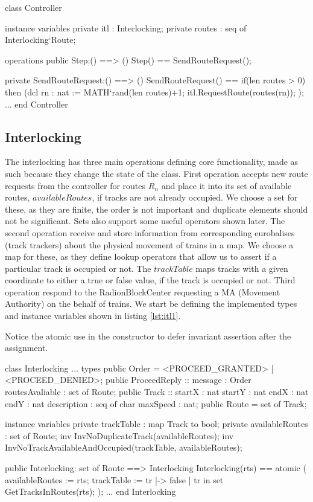 \documentclass[preprint,12pt]{elsarticle}
\begin{document}
\begin{vdmsl}[label=lst:controller,caption=State variables and the SendRouteRequest() operation in the Controller.]
	class Controller
	
	instance variables
	private itl : Interlocking;
	private routes : seq of Interlocking`Route;
	
	operations
	public Step:() ==> ()
	Step() == SendRouteRequest();
	
	private SendRouteRequest:() ==> ()
	SendRouteRequest() ==
	if(len routes > 0) then
		(dcl rn : nat := MATH`rand(len routes)+1;
			itl.RequestRoute(routes(rn));
	);
	...
	end Controller
\end{vdmsl}

\subsection{Interlocking}

The interlocking has three main operations defining core functionality, made as such because they change the state of the class. First operation accepts new route requests from the controller for routes $R_{n}$ and place it into its set of available routes, $availableRoutes$, if tracks are not already occupied. We choose a set for these, as they are finite, the order is not important and duplicate elements should not be significant. Sets also support some useful operators shown later. The second operation receive and store information from corresponding eurobalises (track trackers) about the physical movement of trains in a map. We choose a map for these, as they define lookup operators that allow us to assert if a particular track is occupied or not. The $trackTable$ maps tracks with a given coordinate to either a true or false value, if the track is occupied or not. Third operation respond to the RadionBlockCenter requesting a MA (Movement Authority) on the behalf of trains. We start be defining the implemented types and instance variables shown in listing \ref{lst:itl1}.

Notice the atomic use in the constructor to defer invariant assertion after the assignment.

\begin{vdmsl}[label=lst:itl1,caption=Types and state information and constructor for the Interlocking class.]
	class Interlocking
	...
	types
	public Order = <PROCEED_GRANTED> | <PROCEED_DENIED>;
	public ProceedReply :: message : Order
	routesAvaliable : set of Route;						 
	public Track :: startX : nat
					startY : nat
					endX : nat
					endY : nat
					description : seq of char
					maxSpeed : nat;
	public Route = set of Track;
	
	instance variables
	private trackTable : map Track to bool;
	private availableRoutes : set of Route;
	inv InvNoDuplicateTrack(availableRoutes);
	inv InvNoTrackAvailableAndOccupied(trackTable,
	 availableRoutes);
	
	public Interlocking: set of Route ==> Interlocking
	Interlocking(rts) ==
	atomic (
		availableRoutes := rts;
		trackTable := { tr |-> false |
			 tr in set GetTracksInRoutes(rts)};
	);
	...
	end Interlocking
\end{vdmsl}
\end{document}
